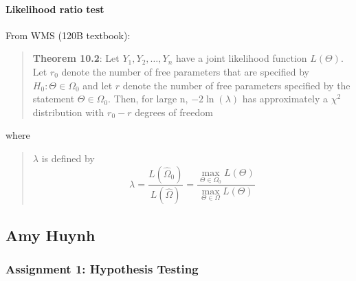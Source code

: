 \documentclass[11pt]{article}
\begin{document}
\hypertarget{likelihood-ratio-test}{%
\paragraph{Likelihood ratio test}\label{likelihood-ratio-test}}

From WMS (120B textbook):

\begin{quote}
\textbf{Theorem 10.2}: Let \(Y_1, Y_2, \dots, Y_n\) have a joint
likelihood function \(L(\Theta)\). Let \(r_0\) denote the number of free
parameters that are specified by \(H_0:\Theta\in\Omega_0\) and let \(r\)
denote the number of free parameters specified by the statement
\(\Theta\in\Omega_0\). Then, for large n, \(-2\ln(\lambda)\) has
approximately a \(\chi^2\) distribution with \(r_0-r\) degrees of
freedom
\end{quote}

where

\begin{quote}
\(\lambda\) is defined by
\[\lambda = \frac{L(\hat\Omega_0)}{L(\hat\Omega)} = \frac{\max_{\Theta\in{\Omega_0}}L(\Theta)}{\max_{\Theta\in{\Omega}}L(\Theta)}\]
\end{quote}

    \hypertarget{amy-huynh}{%
\subsection{Amy Huynh}\label{amy-huynh}}

\hypertarget{assignment-1-hypothesis-testing}{%
\subsubsection{Assignment 1: Hypothesis
Testing}\label{assignment-1-hypothesis-testing}}
\end{document}
